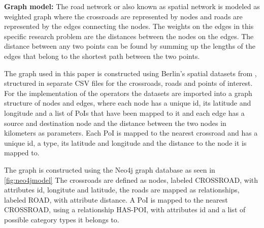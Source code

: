 \textbf{Graph model:}
The road network or also known as spatial network is modeled as weighted graph where the crossroads are represented by nodes and roads are represented by the edges connecting the nodes. The weights on the edges in this specific research problem are the distances between the nodes on the edges. The distance between any two points can be found by summing up the lengths of the edges that belong to the shortest path between the two points.\newline

The graph used in this paper is constructed using Berlin's spatial datasets from \cite{datasets}, structured in separate CSV files for the crossroads, roads and points of interest. For the implementation of the operators the datasets are imported into a graph structure of nodes and edges, where each node has a unique id, its latitude and longitude and a list of PoIs that have been mapped to it and each edge has a source and destination node and the distance between the two nodes in kilometers as parameters. Each PoI is mapped to the nearest crossroad and has a unique id, a type, its latitude and longitude and the distance to the node it is mapped to. \newline

\iffalse
The graph is constructed using the Neo4j graph database as seen in \ref{fig:neo4jmodel}
The crossroads are defined as nodes, labeled CROSSROAD, with attributes id, longitute and latitude, the roads are mapped as relationships, labeled ROAD, with attribute distance. A PoI is mapped to the nearest CROSSROAD, using a relationship HAS-POI, with attributes id and a list of possible category types it belongs to. \cite{evagian}

